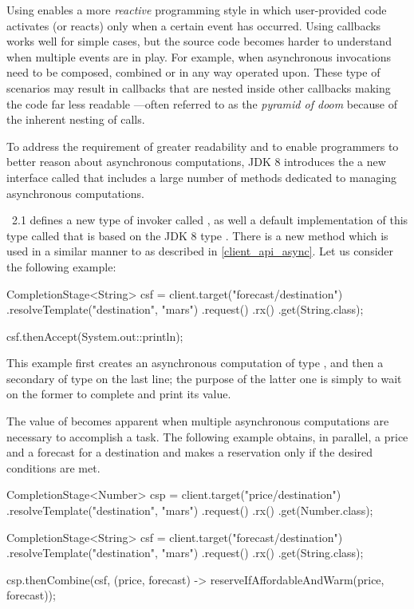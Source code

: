 Using  enables a more \emph{reactive} programming style in which user-provided code activates (or reacts) only when a certain event has occurred. Using callbacks works well for simple cases, but the source code becomes harder to understand when multiple events are in play. For example, when asynchronous invocations need to be composed, combined or in any way operated upon. These type of scenarios may result in callbacks that are nested inside other callbacks making the code far less readable ---often referred to as the \emph{pyramid of doom} because of the inherent nesting of calls.

To address the requirement of greater readability and to enable programmers to better reason about asynchronous computations, JDK 8 introduces the a new interface called  that includes a large number of methods dedicated to managing asynchronous computations. 

\jaxrs\ 2.1 defines a new type of invoker called , as well a default implementation of this type called  that is based on the JDK 8 type . There is a new  method which is used in a similar manner to  as described in \ref{client_api_async}. Let us consider the following example:

\begin{listing}{1}
    CompletionStage<String> csf = client.target("forecast/{destination}")
        .resolveTemplate("destination", "mars")
        .request()
        .rx()
        .get(String.class);

    csf.thenAccept(System.out::println);
\end{listing}

This example first creates an asynchronous computation of type , and then a secondary of type  on the last line; the purpose of the latter one is simply to wait on the former to complete and print its value. 

The value of  becomes apparent when multiple asynchronous computations are necessary to accomplish a task. The following example obtains, in parallel, a price and a forecast for a destination and makes a reservation only if the desired conditions are met. 

\begin{listing}{1}
	CompletionStage<Number> csp = client.target("price/{destination}")
        .resolveTemplate("destination", "mars")
        .request()
        .rx()
        .get(Number.class);

	CompletionStage<String> csf = client.target("forecast/{destination}")
	    .resolveTemplate("destination", "mars")
	    .request()
	    .rx()
	    .get(String.class);
	
	csp.thenCombine(csf, (price, forecast) -> 
	    reserveIfAffordableAndWarm(price, forecast));
\end{listing}

